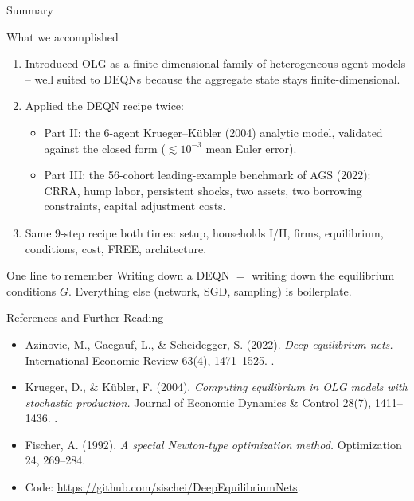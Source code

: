 \documentclass[aspectratio=169,11pt]{beamer}
\newcommand{\emphc}[1]{\textcolor{harvardcrimson}{#1}}
\begin{document}
\begin{frame}{Summary}
\footnotesize
\begin{block}{What we accomplished}
\vspace{-2pt}\begin{enumerate}\itemsep1pt
    \item Introduced OLG as a finite-dimensional family of heterogeneous-agent models -- well suited to DEQNs because the aggregate state stays finite-dimensional.
    \item Applied the DEQN recipe \emphc{twice}:
    \begin{itemize}\itemsep0pt
        \item \emphc{Part II:} the 6-agent Krueger--K\"ubler (2004) analytic model, validated against the closed form ($\lesssim 10^{-3}$ mean Euler error).
        \item \emphc{Part III:} the 56-cohort leading-example benchmark of AGS (2022): CRRA, hump labor, persistent shocks, two assets, two borrowing constraints, capital adjustment costs.
    \end{itemize}
    \item \emphc{Same 9-step recipe} both times: setup, households I/II, firms, equilibrium, conditions, cost, FREE, architecture.
\end{enumerate}
\end{block}

\vspace{-2pt}
\begin{alertblock}{One line to remember}
\emphc{Writing down a DEQN $=$ writing down the equilibrium conditions $G$.}  Everything else (network, SGD, sampling) is boilerplate.
\end{alertblock}
\end{frame}


\begin{frame}{References and Further Reading}
\small
\begin{itemize}\itemsep3pt
    \item Azinovic, M., Gaegauf, L., \& Scheidegger, S. (2022). \emph{Deep equilibrium nets.} International Economic Review 63(4), 1471--1525.  .

    \item Krueger, D., \& K\"ubler, F. (2004). \emph{Computing equilibrium in OLG models with stochastic production.} Journal of Economic Dynamics \& Control 28(7), 1411--1436.  .

    \item Fischer, A. (1992). \emph{A special Newton-type optimization method.} Optimization 24, 269--284.  

    \item Code: \scriptsize\url{https://github.com/sischei/DeepEquilibriumNets}.
\end{itemize}
\end{frame}
\end{document}
